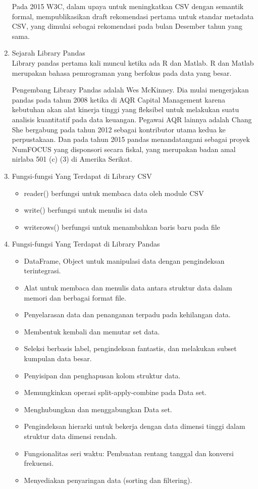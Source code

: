 \begin{enumerate}
Pada 2015 W3C, dalam upaya untuk meningkatkan CSV dengan semantik formal, mempublikasikan draft rekomendasi pertama untuk standar metadata CSV, yang dimulai sebagai rekomendasi pada bulan Desember tahun yang sama.
\item Sejarah Library Pandas\\
Library pandas pertama kali muncul ketika ada R dan Matlab. R dan Matlab merupakan bahasa pemrograman yang berfokus pada data yang besar. 

Pengembang Library Pandas adalah Wes McKinney. Dia mulai mengerjakan pandas pada tahun 2008 ketika di AQR Capital Management karena kebutuhan akan alat kinerja tinggi yang fleksibel untuk melakukan suatu analisis kuantitatif pada data keuangan. Pegawai AQR lainnya adalah Chang She bergabung pada tahun 2012 sebagai kontributor utama kedua ke perpustakaan. Dan pada tahun 2015 pandas menandatangani sebagai proyek NumFOCUS yang disponsori secara fiskal, yang merupakan badan amal nirlaba 501 (c) (3) di Amerika Serikat.

\item Fungsi-fungsi Yang Terdapat di Library CSV
\begin{itemize}
\item reader() berfungsi untuk membaca data oleh module CSV
\item write() berfungsi untuk menulis isi data
\item writerows() berfungsi untuk menambahkan baris baru pada file
\end{itemize}

\item Fungsi-fungsi Yang Terdapat di Library Pandas
\begin{itemize}
\item DataFrame, Object untuk manipulasi data dengan pengindeksan terintegrasi.
\item Alat untuk membaca dan menulis data antara struktur data dalam memori dan berbagai format file.
\item Penyelarasan data dan penanganan terpadu pada kehilangan data.
\item Membentuk kembali dan memutar set data.
\item Seleksi berbasis label, pengindeksan fantastis, dan melakukan subset kumpulan data besar.
\item Penyisipan dan penghapusan kolom struktur data.
\item Memungkinkan operasi split-apply-combine pada Data set.
\item Menghubungkan dan menggabungkan Data set.
\item Pengindeksan hierarki untuk bekerja dengan data dimensi tinggi dalam struktur data dimensi rendah.
\item Fungsionalitas seri waktu: Pembuatan rentang tanggal dan konversi frekuensi.
\item Menyediakan penyaringan data (sorting dan filtering).
\end{itemize}
\end{enumerate}

